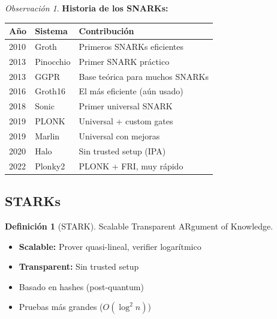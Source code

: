 \documentclass[11pt,a4paper,twoside,openright]{book}
\theoremstyle{definition}
\newtheorem{definition}{Definición}[chapter]
\theoremstyle{plain}
\theoremstyle{remark}
\newtheorem{remark}{Observación}[chapter]
\begin{document}
\begin{remark}
\textbf{Historia de los SNARKs:}

\begin{center}
\begin{tabular}{lll}
\toprule
\textbf{Año} & \textbf{Sistema} & \textbf{Contribución} \\
\midrule
2010 & Groth & Primeros SNARKs eficientes \\
2013 & Pinocchio & Primer SNARK práctico \\
2013 & GGPR & Base teórica para muchos SNARKs \\
2016 & Groth16 & El más eficiente (aún usado) \\
2018 & Sonic & Primer universal SNARK \\
2019 & PLONK & Universal + custom gates \\
2019 & Marlin & Universal con mejoras \\
2020 & Halo & Sin trusted setup (IPA) \\
2022 & Plonky2 & PLONK + FRI, muy rápido \\
\bottomrule
\end{tabular}
\end{center}
\end{remark}

\subsection{STARKs}

\begin{definition}[STARK]
Scalable Transparent ARgument of Knowledge.
\end{definition}

\begin{itemize}
    \item \textbf{Scalable:} Prover quasi-lineal, verifier logarítmico
    \item \textbf{Transparent:} Sin trusted setup
    \item Basado en hashes (post-quantum)
    \item Pruebas más grandes ($O(\log^2 n)$)
\end{itemize}
\end{document}
